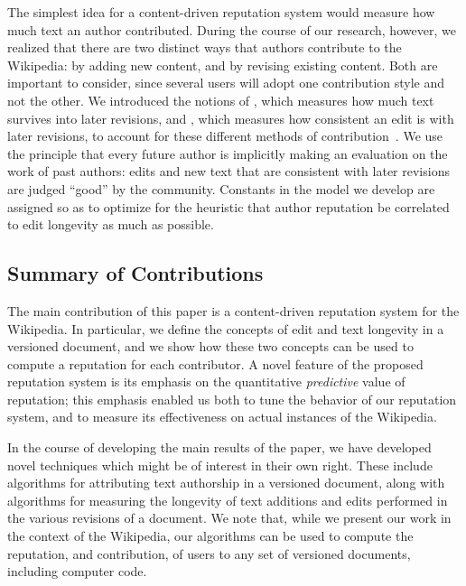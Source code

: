 The simplest idea for a content-driven reputation system would measure
how much text an author contributed.
During the course of our research, however, we realized that there are
two distinct ways that authors contribute to the Wikipedia: by adding
new content, and by revising existing content.
Both are important to consider, since several users will
adopt one contribution style and not the other.
We introduced the notions of
, which measures how much text survives
into later revisions, and , which measures
how consistent an edit is with later revisions,
to account for these different methods of contribution~\cite{Adler2007}.
We use the principle that every future author is
implicitly making an evaluation on the work of past authors:
edits and new text that are consistent with later revisions
are judged ``good'' by the community.
Constants in the model we develop are assigned so as to optimize
for the heuristic that author reputation
be correlated to edit longevity as much as possible.

\subsection{Summary of Contributions} 

The main contribution of this paper is a content-driven reputation
system for the Wikipedia. 
In particular, we define the concepts of edit and text longevity in a
versioned document, and we show how these two concepts can be used to
compute a reputation for each contributor. 
A novel feature of the proposed reputation system is its emphasis on
the quantitative {\em predictive\/} value of reputation; this emphasis
enabled us both to tune the behavior of our reputation system, and to
measure its effectiveness on actual instances of the Wikipedia. 

In the course of developing the main results of the paper, we have
developed novel techniques which might be of interest in their own
right. 
These include algorithms for attributing text authorship in a
versioned document, along with algorithms for measuring the longevity
of text additions and edits performed in the various revisions of a
document. 
We note that, while we present our work in the context of the
Wikipedia, our algorithms can be used to compute the reputation, and
contribution, of users to any set of versioned documents, including
computer code. 


